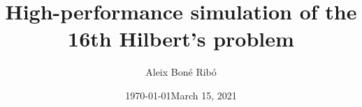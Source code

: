 



\usepackage{fancyhdr}
\usepackage{pgfgantt}
\usepackage{pdflscape}
\usepackage{adjustbox}

\title{High-performance simulation of the 16th Hilbert's problem}
\author{Aleix Bon\'e Rib\'o}
\date{\today}
\date{March 15, 2021}




    



    \tableofcontents \pagebreak




    \setlength{\parskip}{1em plus 0.5em minus 0.2em}

    \pagestyle{fancy}
    \fancyhf{}

